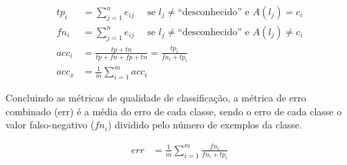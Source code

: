   \begin{align}
    tp_i            &= \sum_{j=1}^{n} e_{ij}        \quad \text{ se } l_j \neq \text{``desconhecido''} \text{ e } A(l_j) = c_i  \\
    fn_i            &= \sum_{j=1}^{n} e_{ij}        \quad \text{ se } l_j \neq \text{``desconhecido''} \text{ e } A(l_j) \neq c_i  \\
    \mathit{acc}_i  &= \frac{tp + tn}{tp+fn+fp+tn}  = \frac{tp_i}{fn_i + tp_i} \\
    \mathit{acc}_x & = \frac{1}{m} \sum_{i=1}^{m} \mathit{acc}_{i} \label{eq:acc}
  \end{align}

Concluindo as métricas de qualidade de classificação, a métrica de erro
combinado (err) é a média do erro de cada classe, sendo o erro de cada classe
o valor falso-negativo ($fn_i$) dividido pelo número de exemplos da classe.

\begin{align}
\mathit{err} &= \frac{1}{m} \sum_{i=1}^{m} \frac{fn_i}{fn_i + tp_i}
\end{align}





